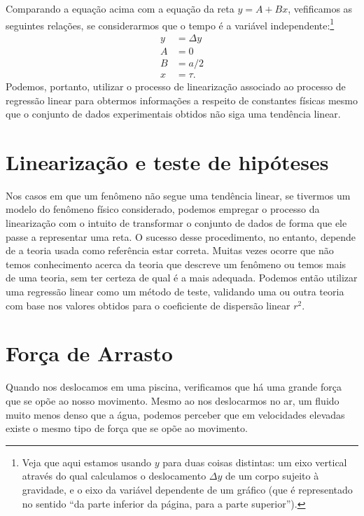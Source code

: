 Comparando a equação acima com a equação da reta $y = A + Bx$, vefificamos as seguintes relações, se considerarmos que o tempo é a variável independente:\footnote{Veja que aqui estamos usando $y$ para duas coisas distintas: um eixo vertical através do qual calculamos o deslocamento $\Delta y$ de um corpo sujeito à gravidade, e o eixo da variável dependente de um gráfico (que é representado no sentido ``da parte inferior da página, para a parte superior'').}
\begin{align}
	y &= \Delta y \\
	A &= 0 \\
	B &= a/2 \\
	x &= \tau.
\end{align}
%
Podemos, portanto, utilizar o processo de linearização associado ao processo de regressão linear para obtermos informações a respeito de constantes físicas mesmo que o conjunto de dados experimentais obtidos não siga uma tendência linear.

\section{Linearização e teste de hipóteses}

Nos casos em que um fenômeno não segue uma tendência linear, se tivermos um modelo do fenômeno físico considerado, podemos empregar o processo da linearização com o intuito de transformar o conjunto de dados de forma que ele passe a representar uma reta. O sucesso desse procedimento, no entanto, depende de a teoria usada como referência estar correta. Muitas vezes ocorre que não temos conhecimento acerca da teoria que descreve um fenômeno ou temos mais de uma teoria, sem ter certeza de qual é a mais adequada. Podemos então utilizar uma regressão linear como um método de teste, validando uma ou outra teoria com base nos valores obtidos para o coeficiente de dispersão linear $r^2$.

\section{Força de Arrasto}

Quando nos deslocamos em uma piscina, verificamos que há uma grande força que se opõe ao nosso movimento. Mesmo ao nos deslocarmos no ar, um fluido muito menos denso que a água, podemos perceber que em velocidades elevadas existe o mesmo tipo de força que se opõe ao movimento. 

